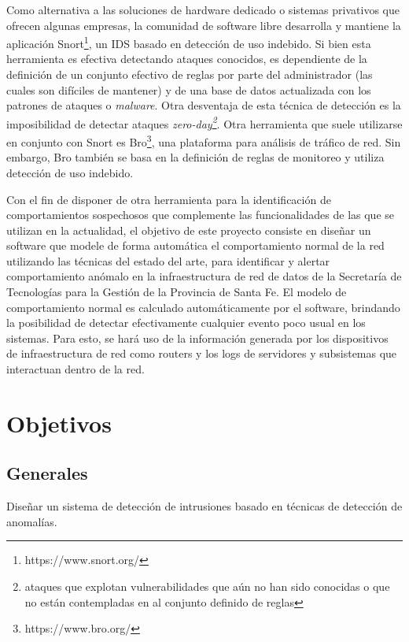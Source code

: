 Como alternativa a las soluciones de hardware dedicado o sistemas privativos que ofrecen algunas empresas, la comunidad de software libre desarrolla y mantiene la aplicación Snort\footnote{https://www.snort.org/}, un IDS basado en detección de uso indebido. Si bien esta herramienta es efectiva detectando ataques conocidos, es dependiente de la definición de un conjunto efectivo de reglas por parte del administrador (las cuales son difíciles de mantener) y de una base de datos actualizada con los patrones de ataques o \textit{malware}. Otra desventaja de esta técnica de detección es la imposibilidad de detectar ataques \textit{zero-day\footnote{ataques que explotan vulnerabilidades que aún no han sido conocidas o que no están contempladas en al conjunto definido de reglas}}\cite{Milenkoski:2015:ECI:2808687.2808691}. Otra herramienta que suele utilizarse en conjunto con Snort es Bro\footnote{https://www.bro.org/}, una plataforma para análisis de tráfico de red. Sin embargo, Bro también se basa en la definición de reglas de monitoreo y utiliza detección de uso indebido. \par

Con el fin de disponer de otra herramienta para la identificación de comportamientos sospechosos que complemente las funcionalidades de las que se utilizan en la actualidad, el objetivo de este proyecto consiste en diseñar un software que modele de forma automática el comportamiento normal de la red utilizando las técnicas del estado del arte, para identificar y alertar comportamiento anómalo en la infraestructura de red de datos de la Secretaría de Tecnologías para la Gestión de la Provincia de Santa Fe. El modelo de comportamiento normal es calculado automáticamente por el software, brindando la posibilidad de detectar efectivamente cualquier evento poco usual en los sistemas. Para esto, se hará uso de la información generada por los dispositivos de infraestructura de red como routers y los logs de servidores y subsistemas que interactuan dentro de la red.

\section*{Objetivos}
\subsection*{Generales}
Diseñar un sistema de detección de intrusiones basado en técnicas de detección de anomalías.
